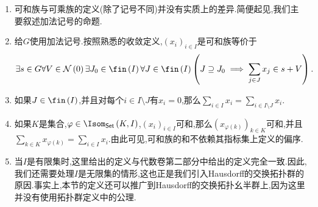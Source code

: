 \begin{remark}{}{}
	\begin{enumerate}
		\item 可和族与可乘族的定义(除了记号不同)并没有实质上的差异.简便起见,我们主要叙述加法记号的命题.
		\item 给$G$使用加法记号.按照熟悉的收敛定义,$\left(x_{i}\right)_{i\in I}$是可和族等价于
		\begin{align*}
			\exists s\in G\forall V\in\mathcal{N}\left(0\right)\exists J_{0}\in\fin\left(I\right)\forall J\in\fin\left(I\right)\left(J\supseteq J_{0}\implies\sum\limits_{j\in J}x_{j}\in s+V\right).
		\end{align*}
		\item 如果$J\in\fin\left(I\right)$,并且对每个$i\in I\setminus J$有$x_{i}=0$,那么$\sum\limits_{i\in I}x_{i}=\sum\limits_{i\in I\setminus{J}}x_{i}$.
		\item 如果$K$是集合,$\varphi\in\Isom_{\mathsf{Set}}\left(K,I\right)$,$\left(x_{i}\right)_{i\in I}$可和,那么$(x_{\varphi\left(k\right)})_{k\in K}$可和,并且$\sum\limits_{k\in K}x_{\varphi\left(k\right)}=\sum\limits_{i\in I}x_{i}$.由此可见,可和族的和不依赖其指标集上定义的偏序.
		\item 当$I$是有限集时,这里给出的定义与代数卷第二部分中给出的定义完全一致.因此,我们还需要处理$I$是无限集的情形,这也正是我们引入Hausdorff的交换拓扑群的原因.事实上,本节的定义还可以推广到Hausdorff的交换拓扑幺半群上,因为这里并没有使用拓扑群定义中的公理.
	\end{enumerate}
\end{remark}
